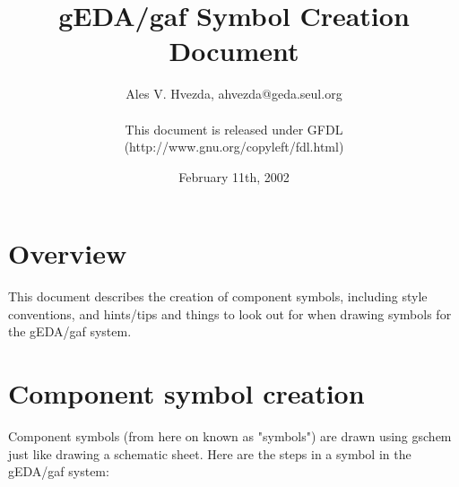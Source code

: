 \documentclass{article}
\title{gEDA/gaf Symbol Creation Document}
\author{Ales V. Hvezda, ahvezda@geda.seul.org\\
	\\
	This document is released under GFDL\\ 
	(http://www.gnu.org/copyleft/fdl.html)}
\date{February 11th, 2002}
\begin{document}
\maketitle
\newpage

\tableofcontents
\newpage


\section{Overview}

This document describes the creation of component symbols, including style
conventions, and hints/tips and things to look out for when drawing symbols
for the gEDA/gaf system.

\section{Component symbol creation}

Component symbols (from here on known as "symbols") are drawn
using gschem just like drawing a schematic sheet.  Here are the steps in
a symbol in the gEDA/gaf system:
\end{document}
